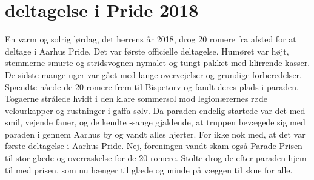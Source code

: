 \section{\TKETS deltagelse i Pride 2018}

En varm og solrig lørdag, det herrens år 2018, drog 20 romere fra \TKET afsted for at deltage i Aarhus Pride. Det var \TKETs første officielle deltagelse. Humøret var højt, stemmerne smurte og stridsvognen nymalet og tungt pakket med klirrende kasser. De sidste mange uger var gået med lange overvejelser og grundige forberedelser. Spændte nåede de 20 romere frem til Bispetorv og fandt deres plads i paraden. Togaerne strålede hvidt i den klare sommersol mod legionærernes røde velourkapper og rustninger i gaffa-sølv. Da paraden endelig startede var det med smil, vejende faner, og de kendte \TK{}-sange gjaldende, at truppen bevægede sig med paraden i gennem Aarhus by og vandt alles hjerter. For ikke nok med, at det var \TKETs første deltagelse i Aarhus Pride. Nej, foreningen vandt skam også Parade Prisen til stor glæde og overraskelse for de 20 romere. Stolte drog de efter paraden hjem til \TKET med prisen, som nu hænger til glæde og minde på væggen til skue for alle.